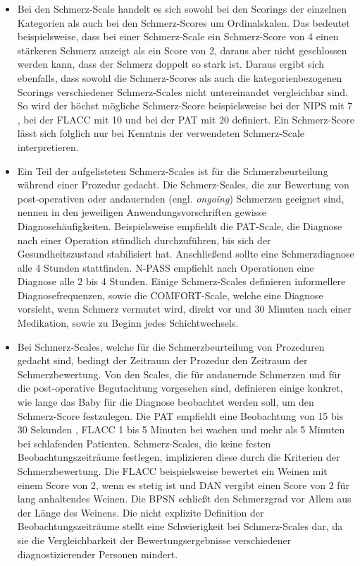 \begin{itemize}
	
	\item Bei den Schmerz-Scale handelt es sich sowohl bei den Scorings der einzelnen Kategorien als auch bei den Schmerz-Scores um Ordinalskalen. Das bedeutet beispielsweise, dass bei einer Schmerz-Scale ein Schmerz-Score von 4 einen stärkeren Schmerz anzeigt als ein Score von 2, daraus aber nicht geschlossen werden kann, dass der Schmerz doppelt so stark ist. Daraus ergibt sich ebenfalls, dass sowohl die Schmerz-Scores als auch die kategorienbezogenen Scorings verschiedener Schmerz-Scales nicht untereinandet vergleichbar sind. So wird der höchst mögliche Schmerz-Score beispielsweise bei der NIPS mit 7 \cite{nips}, bei der FLACC mit 10 \cite{flacc} und bei der PAT mit 20 \cite{pat} definiert. Ein Schmerz-Score lässt sich folglich nur bei Kenntnis der verwendeten Schmerz-Scale interpretieren.
	\item Ein Teil der aufgelisteten Schmerz-Scales ist für die Schmerzbeurteilung während einer Prozedur gedacht. Die Schmerz-Scales, die zur Bewertung von post-operativen oder andauernden (engl. \emph{ongoing}) Schmerzen geeignet sind, nennen in den jeweiligen Anwendungsvorschriften gewisse Diagnosehäufigkeiten. Beispielsweise empfiehlt die PAT-Scale, die Diagnose nach einer Operation stündlich durchzuführen, bis sich der Gesundheitszustand stabilisiert hat. Anschließend sollte eine Schmerzdiagnose alle 4 Stunden stattfinden.\cite{pat} N-PASS empfiehlt nach Operationen eine Diagnose alle 2 bis 4 Stunden.\cite{flacc} Einige Schmerz-Scales definieren informellere Diagnosefrequenzen, sowie die COMFORT-Scale, welche eine Diagnose vorsieht, wenn \glqq Schmerz vermutet wird\grqq{}, direkt vor und 30 Minuten nach einer Medikation, sowie zu Beginn jedes Schichtwechsels.\cite[S. 241]{painAssessmentStatus}
	
	\item Bei Schmerz-Scales, welche für die Schmerzbeurteilung von Prozeduren gedacht sind, bedingt der Zeitraum der Prozedur den Zeitraum der Schmerzbewertung. Von den Scales, die für andauernde Schmerzen und für die post-operative Begutachtung vorgesehen sind, definieren einige konkret, wie lange das Baby für die Diagnose beobachtet werden soll, um den Schmerz-Score festzulegen. Die PAT empfiehlt eine Beobachtung von 15 bis 30 Sekunden \cite{pat}, FLACC 1 bis 5 Minuten bei wachen und mehr als 5 Minuten bei schlafenden Patienten.\cite{flacc} Schmerz-Scales, die keine festen Beobachtungszeiträume festlegen, implizieren diese durch die Kriterien der Schmerzbewertung. Die FLACC beispielsweise bewertet ein Weinen mit einem Score von 2, wenn es \glqq stetig\grqq{} ist und DAN vergibt einen Score von 2 für \glqq lang anhaltendes Weinen\grqq. \cite{flacc} Die BPSN schließt den Schmerzgrad vor Allem aus der Länge des Weinens.\cite{bpsn} Die nicht explizite Definition der Beobachtungszeiträume stellt eine Schwierigkeit bei Schmerz-Scales dar, da sie die Vergleichbarkeit der Bewertungsergebnisse verschiedener diagnostizierender Personen mindert.\cite[S. 100]{painInNeonates}
	

\end{itemize}
